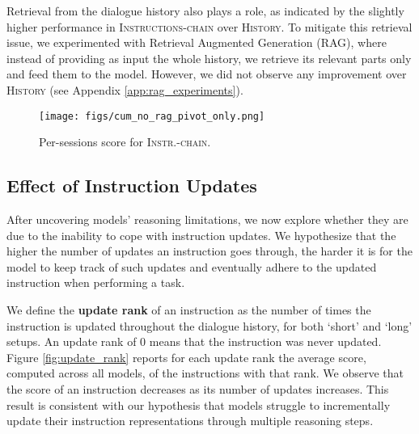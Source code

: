 Retrieval from the dialogue history also plays a role, as indicated by the slightly higher performance in \textsc{Instructions-chain} over \textsc{History}. To mitigate this retrieval issue, we experimented with Retrieval Augmented Generation (RAG), where instead of providing as input the whole history, we retrieve its relevant parts only and feed them to the model. However, we did not observe any improvement over \textsc{History} (see Appendix \ref{app:rag_experiments}).



\begin{figure}[htb]
    \centering
    \texttt{[image: figs/cum\_no\_rag\_pivot\_only.png]}
    \caption{Per-sessions score for \textsc{Instr.-chain}.}
    \label{fig:per_session_command_r_plus}
\end{figure}



\subsection{Effect of Instruction Updates}

After uncovering models' reasoning limitations, we now
explore whether they are due to the inability to cope with instruction updates. 
We hypothesize that the higher the number of updates an instruction goes through, 
the harder it is for the model to keep track of such updates 
and eventually adhere to the updated instruction  
when performing a task.

We define the \textbf{update rank} of an instruction as the number of times the instruction is updated throughout the dialogue history, for both `short' and `long' setups. An update rank of 0 means that the instruction was never updated. 
Figure \ref{fig:update_rank} reports for each update rank the average score, computed across all models, of the instructions with that rank. We observe that the score of an instruction decreases as its number of updates increases. This result is consistent with our hypothesis that models struggle to incrementally update their instruction representations through multiple reasoning steps.  


